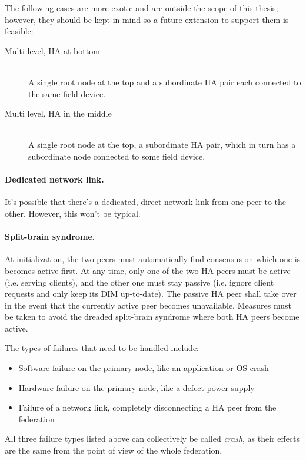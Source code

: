 The following cases are more exotic and are outside the scope of this thesis;
however, they should be kept in mind so a future extension to support them is
feasible:

\begin{description}
	\item [ Multi level, \gls{HA} at bottom ] \hfill\\
	A single root node at the top and a subordinate HA pair each connected
	to the same field device.

	\item [ Multi level, \gls{HA} in the middle ] \hfill\\
	A single root node at the top, a subordinate HA pair, which in turn has
	a subordinate node connected to some field device.
\end{description}


\paragraph{Dedicated network link.}
It's possible that there's a dedicated, direct network link from one peer to
the other. However, this won't be typical.

\paragraph{Split-brain syndrome.}
At initialization, the two peers must automatically find consensus on which one
is becomes active first.  At any time, only one of the two HA peers must be
active (i.e. serving clients), and the other one must stay passive (i.e. ignore
client requests and only keep its DIM up-to-date). The passive HA peer shall
take over in the event that the currently active peer becomes unavailable.
Measures must be taken to avoid the dreaded split-brain syndrome where both HA
peers become active.

The types of failures that need to be handled include:
\begin{itemize}
	\item Software failure on the primary node, like an application or OS crash
	\item Hardware failure on the primary node, like a defect power supply
	\item Failure of a network link, completely disconnecting a HA peer from the federation
\end{itemize}

All three failure types listed above can collectively be called \emph{crash},
as their effects are the same from the point of view of the whole federation.

